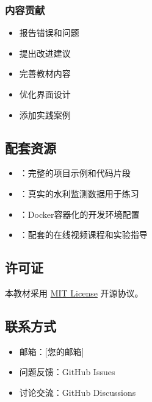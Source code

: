 \hypertarget{ux5185ux5bb9ux8d21ux732e-1}{%
\subsubsection{内容贡献}\label{ux5185ux5bb9ux8d21ux732e-1}}

\begin{itemize}
\tightlist
\item
  报告错误和问题
\item
  \faLightbulb 提出改进建议
\item
  \faEdit 完善教材内容
\item
  优化界面设计
\item
  添加实践案例
\end{itemize}

\hypertarget{ux914dux5957ux8d44ux6e90-1}{%
\subsection{配套资源}\label{ux914dux5957ux8d44ux6e90-1}}

\begin{itemize}
\tightlist
\item
  ：完整的项目示例和代码片段
\item
  ：真实的水利监测数据用于练习
\item
  ：Docker容器化的开发环境配置
\item
  ：配套的在线视频课程和实验指导
\end{itemize}

\hypertarget{ux8bb8ux53efux8bc1-1}{%
\subsection{许可证}\label{ux8bb8ux53efux8bc1-1}}

本教材采用 \href{LICENSE}{MIT License} 开源协议。

\hypertarget{ux8054ux7cfbux65b9ux5f0f-1}{%
\subsection{联系方式}\label{ux8054ux7cfbux65b9ux5f0f-1}}

\begin{itemize}
\tightlist
\item
  邮箱：{[}您的邮箱{]}
\item
  问题反馈：GitHub Issues
\item
  讨论交流：GitHub Discussions
\end{itemize}

